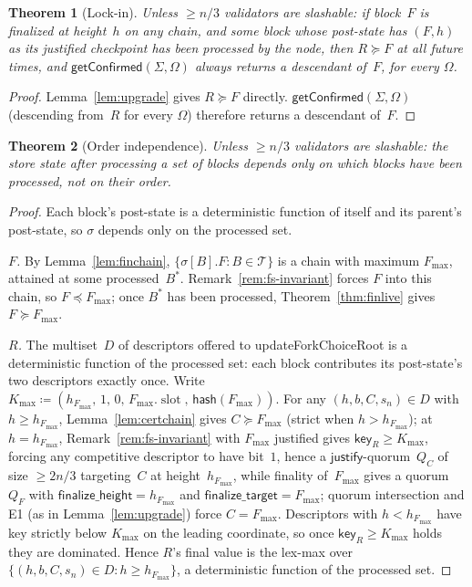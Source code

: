 \documentclass{article}
\newcommand{\T}[0]{\ensuremath{\mathcal{T}}}
\newcommand{\slot}[0]{\ensuremath{\operatorname{\mathrm{slot}}}}
\newcommand{\just}{\ensuremath{\mathsf{justify}}\xspace}
\newcommand{\finalizeHeight}{\mathsf{finalize\_height}}
\newcommand{\finalizeTarget}{\mathsf{finalize\_target}}
\newcommand{\hash}{\mathsf{hash}}
\newcommand{\key}{\mathsf{key}}
\newcommand{\updateForkChoiceRoot}{\textsf{updateForkChoiceRoot}\xspace}
\newcommand{\getConfirmed}{\textsf{getConfirmed}\xspace}
\theoremstyle{plain}
\newtheorem{theorem}{Theorem}
\theoremstyle{definition}
\theoremstyle{remark}
\begin{document}
\begin{theorem}[Lock-in]\label{thm:lockin}
Unless $\geq n/3$ validators are slashable: if block~$F$ is finalized at height~$h$ on any chain, and some block whose post-state has $(F, h)$ as its justified checkpoint has been processed by the node, then $R \succeq F$ at all future times, and $\getConfirmed(\Sigma, \Omega)$ always returns a descendant of~$F$, for every $\Omega$.
\end{theorem}

\begin{proof}
Lemma~\ref{lem:upgrade} gives $R \succeq F$ directly.
$\getConfirmed(\Sigma, \Omega)$ (descending from~$R$ for every $\Omega$) therefore returns a descendant of~$F$.
\end{proof}

\begin{theorem}[Order independence]\label{thm:orderindep}
Unless $\geq n/3$ validators are slashable: the store state after processing a set of blocks depends only on which blocks have been processed, not on their order.
\end{theorem}

\begin{proof}
Each block's post-state is a deterministic function of itself and its parent's post-state, so $\sigma$ depends only on the processed set.

\emph{$F$.} By Lemma~\ref{lem:finchain}, $\{\sigma[B].F : B \in \T\}$ is a chain with maximum $F_{\max}$, attained at some processed~$B^\ast$.
Remark~\ref{rem:fs-invariant} forces $F$ into this chain, so $F \preceq F_{\max}$; once $B^\ast$ has been processed, Theorem~\ref{thm:finlive} gives $F \succeq F_{\max}$.

\emph{$R$.} The multiset~$D$ of descriptors offered to \updateForkChoiceRoot is a deterministic function of the processed set: each block contributes its post-state's two descriptors exactly once.
Write $K_{\max} \coloneqq (h_{F_{\max}},\, 1,\, 0,\, F_{\max}.\slot,\, \hash(F_{\max}))$.
For any $(h, b, C, s_n) \in D$ with $h \geq h_{F_{\max}}$, Lemma~\ref{lem:certchain} gives $C \succeq F_{\max}$ (strict when $h > h_{F_{\max}}$); at $h = h_{F_{\max}}$, Remark~\ref{rem:fs-invariant} with $F_{\max}$ justified gives $\key_R \geq K_{\max}$, forcing any competitive descriptor to have bit~$1$, hence a \just-quorum~$Q_C$ of size $\geq 2n/3$ targeting~$C$ at height~$h_{F_{\max}}$, while finality of~$F_{\max}$ gives a quorum~$Q_F$ with $\finalizeHeight = h_{F_{\max}}$ and $\finalizeTarget = F_{\max}$; quorum intersection and E1 (as in Lemma~\ref{lem:upgrade}) force $C = F_{\max}$.
Descriptors with $h < h_{F_{\max}}$ have key strictly below $K_{\max}$ on the leading coordinate, so once $\key_R \geq K_{\max}$ holds they are dominated.
Hence $R$'s final value is the lex-max over $\{(h, b, C, s_n) \in D : h \geq h_{F_{\max}}\}$, a deterministic function of the processed set.
\end{proof}
\end{document}
